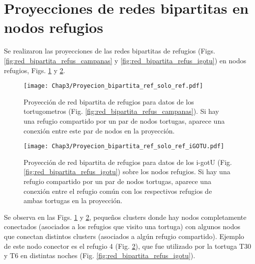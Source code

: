 \section{Proyecciones de redes bipartitas en nodos refugios}
Se realizaron las proyecciones de las redes bipartitas de refugios (Figs. \ref{fig:red_bipartita_refus_campanas} y \ref{fig:red_bipartita_refus_igotu}) en nodos refugios, Figs. \ref{fig:proyeccion_red_campanas_refus} y \ref{fig:proyeccion_red_igotu_refus}.
 
 
\begin{figure}[ht]
    \begin{center}
        \texttt{[image: Chap3/Proyecion\_bipartita\_ref\_solo\_ref.pdf]}
        \caption[Proyección  de red bipartita de refugios para datos de los tortugometros en nodos refugios.]{Proyección  de red bipartita de refugios para datos de los tortugometros (Fig. \ref{fig:red_bipartita_refus_campanas}). Si hay una refugio compartido por un par de nodos tortugas, aparece una conexión entre este par de nodos en la proyección. }
        \label{fig:proyeccion_red_campanas_refus}
       
        \end{center}
\end{figure}
 
\begin{figure}[ht]
    \begin{center}
        \texttt{[image: Chap3/Proyecion\_bipartita\_ref\_solo\_ref\_iGOTU.pdf]}
        \caption[Proyección  de red bipartita de refugios para datos de los i-gotU en nodos refugios.]{Proyección  de red bipartita de refugios para datos de los i-gotU (Fig. \ref{fig:red_bipartita_refus_igotu}) sobre los nodos refugios. Si hay una refugio compartido por un par de nodos tortugas, aparece una conexión entre el refugio común con los respectivos refugios de ambas tortugas en la proyección. }
        \label{fig:proyeccion_red_igotu_refus}
       
        \end{center}
\end{figure}
Se observa en las Figs. \ref{fig:proyeccion_red_campanas_refus} y \ref{fig:proyeccion_red_igotu_refus}, pequeños clusters donde hay nodos completamente conectados (asociados a los refugios que visito una tortuga) con algunos nodos que conectan distintos clusters (asociados a algún refugio compartido). Ejemplo de este nodo conector es el refugio 4 (Fig. \ref{fig:proyeccion_red_igotu_refus}), que fue utilizado por la tortuga T30 y T6 en distintas noches (Fig. \ref{fig:red_bipartita_refus_igotu}).
 
